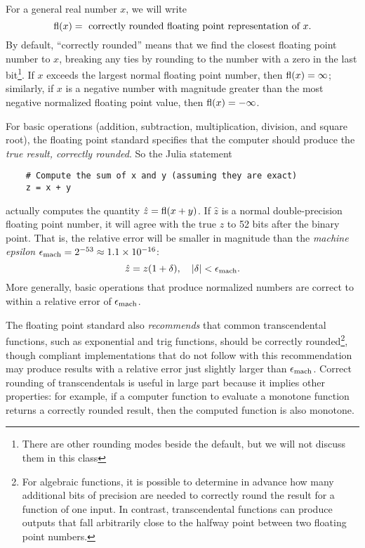 \documentclass[12pt, leqno]{article} %
\begin{document}
For a general real number $x$, we will write
\[
  \operatorname{fl}(x) = \mbox{ correctly rounded floating point representation of } x.
\]
By default, ``correctly rounded'' means that we find the closest
floating point number to $x$, breaking any ties by rounding to the
number with a zero in the last bit\footnote{%
There are other rounding modes beside the default, but we will not
discuss them in this class}.
If $x$ exceeds the largest normal floating point number,
then $\operatorname{fl}(x) = \infty$; similarly, if $x$ is a negative number
with magnitude greater than the most negative normalized floating
point value, then $\operatorname{fl}(x) = -\infty$.

For basic operations (addition, subtraction, multiplication,
division, and square root), the floating point standard specifies that
the computer should produce the {\em true result, correctly rounded}.
So the Julia statement
\begin{lstlisting}
    # Compute the sum of x and y (assuming they are exact)
    z = x + y
\end{lstlisting}
actually computes the quantity $\hat{z} = \operatorname{fl}(x+y)$.  If $\hat{z}$ is
a normal double-precision floating point number, it will agree with
the true $z$ to 52 bits after the binary point.  That is, the relative
error will be smaller in magnitude than the {\em machine epsilon}
$\epsilon_{\mathrm{mach}} = 2^{-53} \approx 1.1 \times 10^{-16}$:
\[
  \hat{z} = z(1+\delta), \quad |\delta| < \epsilon_{\mathrm{mach}}.
\]
More generally, basic operations that produce normalized numbers are
correct to within a relative error of $\epsilon_{\mathrm{mach}}$.

The floating
point standard also {\em recommends} that common transcendental functions,
such as exponential and trig functions, should be correctly rounded\footnote{%
For algebraic functions, it is possible to determine in advance how many
additional bits of precision are needed to correctly round the result
for a function of one input.  In contrast, transcendental functions
can produce outputs that fall arbitrarily close to the halfway point
between two floating point numbers.
},
though compliant implementations that do not follow with this
recommendation may produce results with a relative error
just slightly larger than $\epsilon_{\mathrm{mach}}$.
Correct rounding of transcendentals is useful in large part because it
implies other properties: for example, if a computer function to evaluate
a monotone function returns a correctly rounded result, then the computed
function is also monotone.
\end{document}
